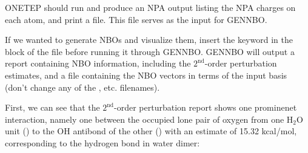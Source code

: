 \documentclass[letterpaper,10pt,english]{sphinxmanual}
\begin{document}
ONETEP should run and produce an NPA output listing the NPA charges on
each atom, and print a  file. This  file
serves as the input for GENNBO.

If we wanted to generate NBOs and visualize them, insert the keyword
 in the  block of the  file before running it
through GENNBO. GENNBO will output a report containing NBO information,
including the \(2^{\mathrm{nd}}\)-order perturbation estimates, and
a  file containing the NBO vectors in terms of the  input
basis (don’t change any of the ,  etc. filenames).

First, we can see that the \(2^{\mathrm{nd}}\)-order perturbation
report shows one prominenet interaction, namely one between the occupied
lone pair of oxygen from one H\(_2\)O unit () to
the O\textendash{}H antibond of the other () with an estimate of
15.32 kcal/mol, corresponding to the hydrogen bond in water dimer:
\end{document}
